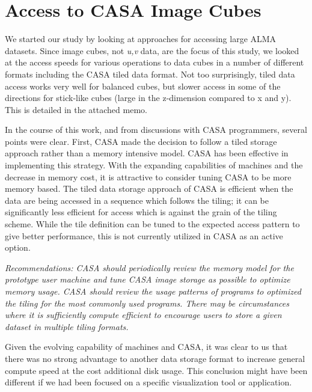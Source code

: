 
\section{Access to CASA Image Cubes}

We started our study by looking at approaches for accessing large
ALMA datasets. Since image cubes, not {\it u,v} data, are the
focus of this study, we looked at the access speeds for various
operations to data cubes in a number of different formats including
the CASA tiled data format. Not too surprisingly, tiled data
access works very well for balanced cubes, but slower 
access in some of the directions for stick-like cubes (large in the
z-dimension compared to x and y).
This is detailed in the attached memo.

In the course of this work, and from discussions with CASA programmers,
several points were clear. First, CASA made the decision to follow a
tiled storage approach rather than a memory intensive model. CASA has
been effective in implementing this strategy.
With the expanding capabilities of machines and
the decrease in memory cost, it is attractive to consider tuning CASA
to be more memory based.
The tiled data storage approach of CASA is
efficient when the data are being accessed in a sequence which
follows the tiling; it can be significantly less efficient
for access which is against the grain of the tiling scheme. 
While the tile definition can be tuned to the expected access pattern
to give better performance, this is not currently utilized in CASA
as an active option.

{\it Recommendations: CASA should periodically review the memory model
for the prototype user machine and tune CASA image storage as possible to optimize
memory usage. CASA should review the usage patterns of programs to
optimized the tiling for the most commonly used programs. There may be
circumstances where it is sufficiently compute efficient to encourage users
to store a given dataset in multiple tiling formats.}

Given the evolving capability of machines and CASA, it was clear to us
that there was no strong advantage to another data storage format to increase
general compute speed at the cost additional disk usage. This conclusion
might have been different if we had been focused on a specific visualization
tool or application.

